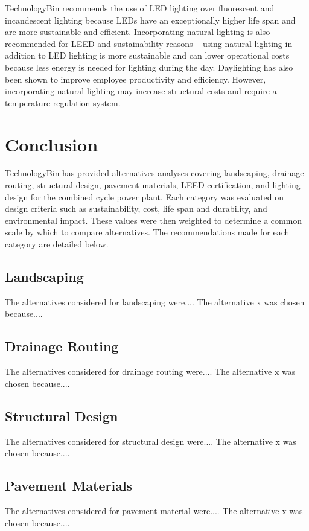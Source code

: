 \documentclass{ceri}
\begin{document}
TechnologyBin recommends the use of LED lighting over fluorescent and incandescent lighting because LEDs have an exceptionally higher life span and are more sustainable and efficient. Incorporating natural lighting is also recommended for LEED and sustainability reasons – using natural lighting in addition to LED lighting is more sustainable and can lower operational costs because less energy is needed for lighting during the day. Daylighting has also been shown to improve employee productivity and efficiency. However, incorporating natural lighting may increase structural costs and require a temperature regulation system.
\newpage
\section{Conclusion}
TechnologyBin has provided alternatives analyses covering landscaping, drainage routing, structural design, pavement materials, LEED certification, and lighting design for the combined cycle power plant. Each category was evaluated on design criteria such as sustainability, cost, life span and durability, and environmental impact. These values were then weighted to determine a common scale by which to compare alternatives. The recommendations made for each category are detailed below.

\subsection{Landscaping}
The alternatives considered for landscaping were....
The alternative x was chosen because....

\subsection{Drainage Routing}
The alternatives considered for drainage routing were....
The alternative x was chosen because....

\subsection{Structural Design}
The alternatives considered for structural design were....
The alternative x was chosen because....

\subsection{Pavement Materials}
The alternatives considered for pavement material were....
The alternative x was chosen because....
\end{document}
